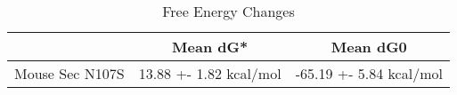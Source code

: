                                                               \begin{table}[ht]
                                                                \centering
                                                                \begin{tabular}{|c|c|c|}
                                                                \hline
                                                                  & Mean dG* & Mean dG0 \\
                                                                \hline
                                                                Mouse Sec N107S & 13.88 +- 1.82 kcal/mol & -65.19 +- 5.84 kcal/mol \\
                                                                \hline
                                                                \end{tabular}
                                                                \caption{Free Energy Changes}
                                                                \end{table}
                                                                
                                                            
                                                  
                                                


                    
                
                

            
            
        

    
    